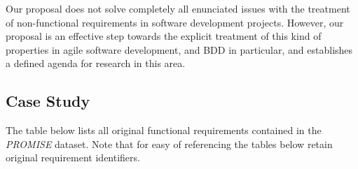 \documentclass[dissertation,final]{softeng}
\begin{document}
Our proposal does not solve completely all enunciated issues with the treatment of non-functional requirements in software development projects. However, our proposal is an effective step towards the explicit treatment of this kind of properties in agile software development, and BDD in particular, and establishes a defined agenda for research in this area.

\begin{appendices}
\chapter{Case Study}
\label{ch:case_study_appendix}
The table below lists all original functional requirements contained in the \emph{PROMISE} dataset. Note that for easy of referencing the tables below retain original requirement identifiers.


\end{appendices}
\end{document}
